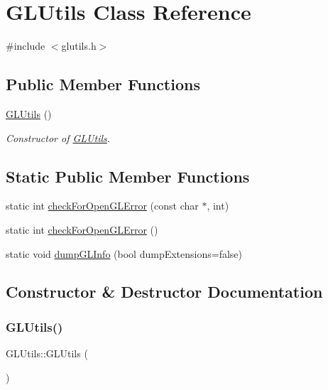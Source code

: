 \hypertarget{class_g_l_utils}{}\section{G\+L\+Utils Class Reference}
\label{class_g_l_utils}


{\ttfamily \#include $<$glutils.\+h$>$}

\subsection*{Public Member Functions}
\begin{DoxyCompactItemize}
\item 
\hyperlink{class_g_l_utils_a259722d18bb9c6aceb35628a1e70e8eb}{G\+L\+Utils} ()
\begin{DoxyCompactList}\small\item\em Constructor of \hyperlink{class_g_l_utils}{G\+L\+Utils}. \end{DoxyCompactList}\end{DoxyCompactItemize}
\subsection*{Static Public Member Functions}
\begin{DoxyCompactItemize}
\item 
static int \hyperlink{class_g_l_utils_ae607a5d975a4e5f5ad12ca597fa6da6e}{check\+For\+Open\+G\+L\+Error} (const char $\ast$, int)
\item 
static int \hyperlink{class_g_l_utils_a6a512ab58f764da2a706f4d0ed6b060e}{check\+For\+Open\+G\+L\+Error} ()
\item 
static void \hyperlink{class_g_l_utils_a065718e951492c03747f34ec08f71d64}{dump\+G\+L\+Info} (bool dump\+Extensions=false)
\end{DoxyCompactItemize}


\subsection{Constructor \& Destructor Documentation}
\hypertarget{class_g_l_utils_a259722d18bb9c6aceb35628a1e70e8eb}{}\label{class_g_l_utils_a259722d18bb9c6aceb35628a1e70e8eb} 
\subsubsection{\texorpdfstring{G\+L\+Utils()}{GLUtils()}}
{\footnotesize\ttfamily G\+L\+Utils\+::\+G\+L\+Utils (\begin{DoxyParamCaption}{ }\end{DoxyParamCaption})}




